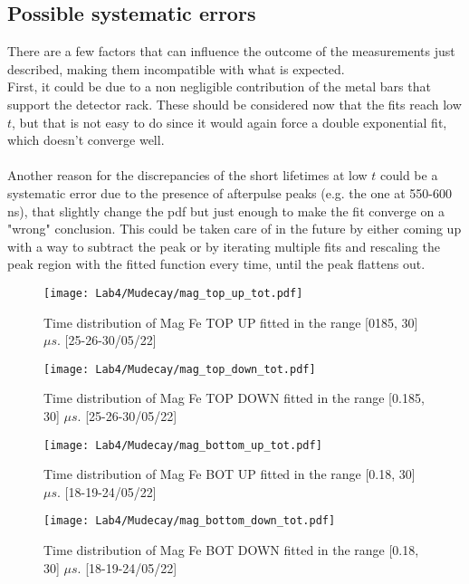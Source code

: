 \documentclass[10pt,a4paper,twocolumn]{article}
\begin{document}
\subsection{Possible systematic errors}

There are a few factors that can influence the outcome of the measurements just described, making them incompatible with what is expected.
\\
First, it could be due to a non negligible contribution of the metal bars that support the detector rack. These should be considered now that the fits reach low $t$, but that is not easy to do since it would again force a double exponential fit, which doesn't converge well.
\\
\\
Another reason for the discrepancies of the short lifetimes at low $t$ could be a systematic error due to the presence of afterpulse peaks (e.g. the one at 550-600 ns), that slightly change the pdf but just enough to make the fit converge on a "wrong" conclusion. This could be taken care of in the future by either coming up with a way to subtract the peak or by iterating multiple fits and rescaling the peak region with the fitted function every time, until the peak flattens out.

\begin{figure}[h!]
\centering
\caption{Time distribution of Mag Fe TOP UP fitted in the range [0185, 30] $\mu s$. [25-26-30/05/22]}
\texttt{[image: Lab4/Mudecay/mag\_top\_up\_tot.pdf]} 
\label{MAGTOPUP-}
\end{figure}

\begin{figure}[h!]
\centering
\caption{Time distribution of Mag Fe TOP DOWN fitted in the range [0.185, 30] $\mu s$. [25-26-30/05/22]}
\texttt{[image: Lab4/Mudecay/mag\_top\_down\_tot.pdf]}
\label{MAGTOPDW-}
\end{figure}

\begin{figure}[h!]
\centering
\caption{Time distribution of Mag Fe BOT UP fitted in the range [0.18, 30] $\mu s$. [18-19-24/05/22]}
\texttt{[image: Lab4/Mudecay/mag\_bottom\_up\_tot.pdf]}
\label{MAGBOTUP-}
\end{figure}

\begin{figure}[h!]
\centering
\caption{Time distribution of Mag Fe BOT DOWN fitted in the range [0.18, 30] $\mu s$. [18-19-24/05/22]}
\texttt{[image: Lab4/Mudecay/mag\_bottom\_down\_tot.pdf]} 
\label{MAGBOTDW-}
\end{figure}
\end{document}

